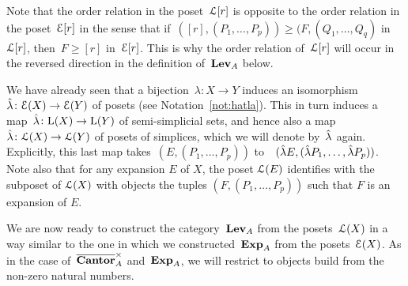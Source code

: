 Note that the order relation in the poset~$\mathcal{L}[r]$ is opposite to the order relation in the poset~$\mathcal{E}[r]$ in the sense that if~\hbox{$ ([r],(P_1,\dots,P_p))\ge(F,(Q_1,\dots,Q_q)$} in~$\mathcal{L}[r]$, then~$F\ge [r]$ in~$\mathcal{E}[r]$. This is why the order relation of~$\mathcal{L}[r]$ will occur in the reversed direction in the definition of~$\mathbf{Lev}_A$ below. 


We have already seen that a bijection~$\lambda\colon X\to Y$ induces an isomorphism~$\hat{\lambda}\colon\mathcal{E}(X)\to\mathcal{E}(Y)$ of posets (see Notation~\ref{not:hatla}). This in turn induces a map~$\hat\lambda\colon \mathrm{L}(X)\to \mathrm{L}(Y)$ of semi-simplicial sets, and hence also  a map~$\hat\lambda\colon\mathcal{L}(X)\to \mathcal{L}(Y)$ of posets of simplices, which we will denote by~$\hat{\lambda}$ again. Explicitly, this last map takes~$ (E,(P_1,\dots,P_p))$ to~~$(\hat{\lambda} E,(\hat{\lambda} P_1,\dots,\hat{\lambda} P_p))$.
Note also that for any expansion $E$ of $X$, the poset $\mathcal{L}(E)$ identifies with the subposet of $\mathcal{L}(X)$ with objects the tuples $(F,(P_1,\dots,P_p))$ such that $F$ is an expansion of $E$. 


We are now ready to construct the category~$\mathbf{Lev}_A$ from the posets~$\mathcal{L}(X)$ in a way similar to the one in which we constructed~$\mathbf{Exp}_A$ from the posets~$\mathcal{E}(X)$. 
As in the case of~$\overline{\mathbf{Cantor}}_A^\times$ and~$\mathbf{Exp}_A$, we will restrict to objects build from the non-zero natural numbers. %

